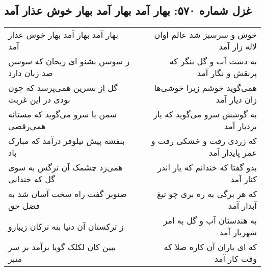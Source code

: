 \begin{center}
\section*{غزل شماره ۵۷۰: بهار آمد بهار آمد بهار خوش عذار آمد}
\label{sec:0570}
\begin{longtable}{l p{0.5cm} r}
بهار آمد بهار آمد بهار خوش عذار آمد
&&
خوش و سرسبز شد عالم اوان لاله زار آمد
\\
ز سوسن بشنو ای ریحان که سوسن صد زبان دارد
&&
به دشت آب و گل بنگر که پرنقش و نگار آمد
\\
گل از نسرین همی‌پرسد که چون بودی در این غربت
&&
همی‌گوید خوشم زیرا خوشی‌ها زان دیار آمد
\\
سمن با سرو می‌گوید که مستانه همی‌رقصی
&&
به گوشش سرو می‌گوید که یار بردبار آمد
\\
بنفشه پیش نیلوفر درآمد که مبارک باد
&&
که زردی رفت و خشکی رفت و عمر پایدار آمد
\\
همی‌زد چشمک آن نرگس به سوی گل که خندانی
&&
بدو گفتا که خندانم که یار اندر کنار آمد
\\
صنوبر گفت راه سخت آسان شد به فضل حق
&&
که هر برگی به ره بری چو تیغ آبدار آمد
\\
ز ترکستان آن دنیا بنه ترکان زیبارو
&&
به هندستان آب و گل به امر شهریار آمد
\\
ببین کان لکلک گویا برآمد بر سر منبر
&&
که ای یاران آن کاره صلا که وقت کار آمد
\\
\end{longtable}
\end{center}
